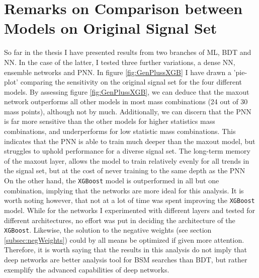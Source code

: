 \section{Remarks on Comparison between Models on Original Signal Set}
So far in the thesis I have presented results from two branches of \ac{ML}, \acf{BDT} and \acf{NN}. In the case of the latter, I tested
three further variations, a dense \ac{NN}, ensemble networks and \ac{PNN}. In figure \ref{fig:GenPlussXGB} I have drawn a 'pie-plot' comparing 
the sensitivity on the original signal set for the four different models. By assessing figure \ref{fig:GenPlussXGB}, we can deduce that the 
maxout network outperforms all other models in most mass combinations (24 out of 30 mass points), although not by much. Additionally, we can discern 
that the \ac{PNN} is far more sensitive than the other models for higher statistics mass combinations, and underperforms for low statistic mass combinations.
This indicates that the \ac{PNN} is able to train much deeper than the maxout model, but struggles to uphold performance for a diverse signal set. 
The long-term memory of the maxout layer, allows the model to train relatively evenly for all trends in the signal set, but at the cost of never 
training to the same depth as the \ac{PNN}
\\
On the other hand, the \verb!XGBoost! model is outperformed in all but one combination, implying that the networks are more ideal for this analysis. 
It is worth noting however, that not at a lot of time was spent improving the \verb!XGBoost! model. While for the networks I experimented with different layers and 
tested for different architectures, no effort was put in deciding the architecture of the \verb!XGBoost!. Likewise, the solution to the negative weights (see 
section \ref{subsec:negWeights}) could by all means be optimized if given more attention. Therefore, it is worth saying that the results in this analysis
do not imply that deep networks are better analysis tool for \ac{BSM} searches than \ac{BDT}, but rather exemplify the advanced capabilities of deep networks.
